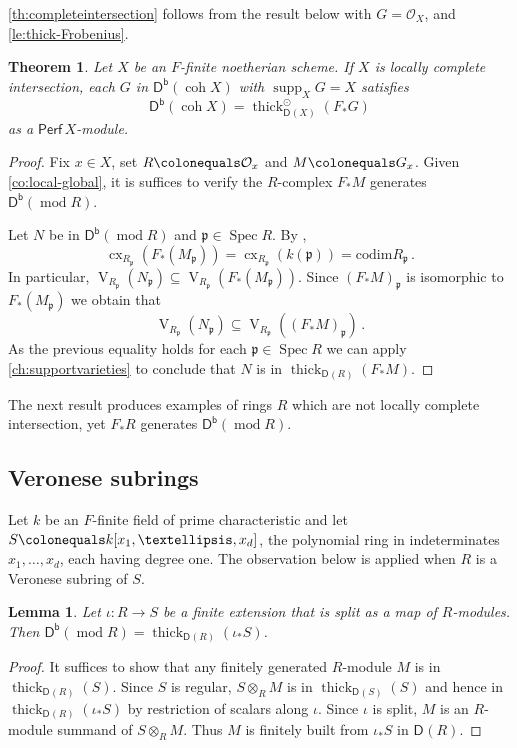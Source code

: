 \documentclass{amsart}
\newcommand{\dcat}[2][]{\cat{D}_{#1}(#2)}
\newcommand{\perf}[1]{\mathsf{Perf}\,#1}
\newcommand{\coh}{\operatorname{coh}}
\newcommand{\dbcat}[1]{\cat{D}^{\mathsf{b}}(#1)}
\newcommand{\mco}{\mathcal{O}}
\newcommand{\fp}{\mathfrak{p}}
\newcommand{\cat}[1]{{\mathsf{#1}}}
\newcommand{\cx}{\operatorname{cx}}
\newcommand{\rmod}{\operatorname{mod}}
\newcommand{\spec}{\operatorname{Spec}}
\newcommand{\supp}{\operatorname{supp}}
\newcommand{\thick}{\operatorname{thick}}
\newcommand{\rmV}{\operatorname{V}}
\newtheorem{theorem}[subsection]{Theorem}
\newtheorem{lemma}[subsection]{Lemma}
\theoremstyle{definition}
\theoremstyle{remark}
\numberwithin{equation}{subsection}
\begin{document}
\cref{th:completeintersection} follows from the result below with $G=\mco_X$, and \cref{le:thick-Frobenius}.

\begin{theorem}
\label{th:completeintersection-2}
Let $X$ be an $F $-finite noetherian scheme. If $X$ is locally complete intersection, each $G$ in $\dbcat{\coh X}$ with $\supp_X G= X$ satisfies
\[
\dbcat{\coh X}=\thick^{\odot}_{\dcat X}(F_*G)
\]
as a $\perf X$-module.
\end{theorem}

\begin{proof}
Fix $x\in X$, set $R\colonequals \mco_x$ and $M\colonequals G_x$. Given \cref{co:local-global}, it is suffices to verify the $R$-complex $F _*M$ generates $\dbcat{\rmod R}$.

Let $N$ be in $ \dbcat{\rmod R}$ and $\fp\in \spec R$. By \cite[Theorem~12.2.4]{Avramov/Iyengar/Miller:2006},
\[
\cx_{R_\fp}(F _*(M_\fp))=\cx_{R_\fp}(k(\fp)) =\mathrm{codim} R_\fp\,.
\]
In particular, $\rmV_{R_\fp}(N_\fp)\subseteq \rmV_{R_\fp}(F _*(M_\fp))$. Since $(F _*M)_\fp$ is isomorphic to $F _*(M_\fp)$ we obtain that 
\[
\rmV_{R_\fp}(N_\fp)\subseteq \rmV_{R_\fp}((F _*M)_\fp)\,.
\]
As the previous equality holds for each $\fp\in \spec R$ we can apply \cref{ch:supportvarieties} to conclude that $N$ is in $\thick_{\dcat R}(F _*M)$. 
\end{proof}

 The next result produces examples of rings $R$ which are not locally complete intersection, yet $F _*R$ generates $\dbcat{\rmod R}$.

\subsection*{Veronese subrings}
Let $k$ be an $F $-finite field of prime characteristic and let $S\colonequals k[x_1, \ldots, x_d]$, the polynomial ring in indeterminates $x_1,\dots,x_d$, each having degree one. The observation below is applied when $R$ is a Veronese subring of $S$.

\begin{lemma}
\label{le:S-generates}
Let $\iota\colon R\to S$ be a finite extension that is split as a map of $R$-modules.
Then $\dbcat{\rmod R}= \thick_{\dcat R}(\iota_*S)$. 
\end{lemma}

\begin{proof}
It suffices to show that any finitely generated $R$-module $M$ is in $\thick_{\dcat R}(S)$. Since $S$ is regular, $S \otimes_R M$ is in $\thick_{\dcat S}(S)$ and hence in $\thick_{\dcat R}(\iota_*S)$ by restriction of scalars along $\iota$. Since $\iota$ is split, $M$ is an $R$-module summand of $S \otimes_RM $. Thus $M$ is finitely built from $\iota _* S$ in $\dcat{R}$. 
\end{proof}
\end{document}

